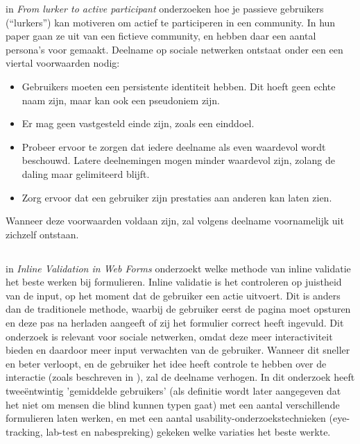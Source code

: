 \documentclass[a4paper, 10pt, pdftex]{report}
\begin{document}
    in \emph{From lurker to active participant} onderzoeken \citeauthor{Sloep2009} hoe je passieve gebruikers (``lurkers'') kan motiveren om actief te participeren in een community. In hun paper gaan ze uit van een fictieve community, en hebben daar een aantal persona's voor gemaakt. Deelname op sociale netwerken ontstaat onder een een viertal voorwaarden nodig:
    \begin{itemize}
    \item Gebruikers moeten een persistente identiteit hebben. Dit hoeft geen echte naam zijn, maar kan ook een pseudoniem zijn.
    \item Er mag geen vastgesteld einde zijn, zoals een einddoel.
    \item Probeer ervoor te zorgen dat iedere deelname als even waardevol wordt beschouwd. Latere deelnemingen mogen minder waardevol zijn, zolang de daling maar gelimiteerd blijft.
    \item Zorg ervoor dat een gebruiker zijn prestaties aan anderen kan laten zien.
  \end{itemize}
    Wanneer deze voorwaarden voldaan zijn, zal volgens \citeauthor{Sloep2009} deelname voornamelijk uit zichzelf ontstaan.

  \subsection{\cite{Wroblewski2009}}
    in \emph{Inline Validation in Web Forms} onderzoekt \citeauthor{Wroblewski2009} welke methode van inline validatie het beste werken bij formulieren. Inline validatie is het controleren op juistheid van de input, op het moment dat de gebruiker een actie uitvoert. Dit is anders dan de traditionele methode, waarbij de gebruiker eerst de pagina moet opsturen en deze pas na herladen aangeeft of zij het formulier correct heeft ingevuld. Dit onderzoek is relevant voor sociale netwerken, omdat deze meer interactiviteit bieden en daardoor meer input verwachten van de gebruiker. Wanneer dit sneller en beter verloopt, en de gebruiker het idee heeft controle te hebben over de interactie (zoals beschreven in \cite{Beenen2004}), zal de deelname verhogen. In dit onderzoek heeft \citeauthor{Wroblewski2009} twee\"{e}ntwintig 'gemiddelde gebruikers'  (als definitie wordt later aangegeven dat het niet om mensen die blind kunnen typen gaat) met een aantal verschillende formulieren laten werken, en met een aantal usability-onderzoekstechnieken (eye-tracking, lab-test en nabespreking) gekeken welke variaties het beste werkte.
\end{document}
